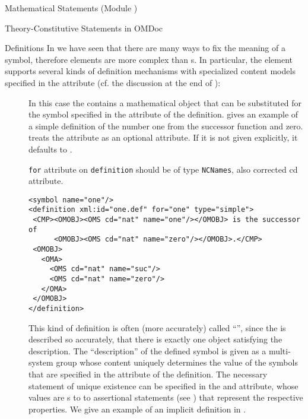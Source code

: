 \begin{tchapter}[id=statements,short=Mathematical Statements]{Mathematical Statements (Module {})}
\begin{tsection}[id=definitions]{Theory-Constitutive Statements in OMDoc}
\begin{tsubsection}[id=definitions]{Definitions}
  In {} we have seen that there are many ways to fix the meaning of a
  symbol, therefore {\omdoc} {} elements are more complex than
  {s}.  In particular, the {} element supports several
  kinds of definition mechanisms with specialized content models specified in the
  {} attribute (cf. the discussion at the end of
  {}):
\begin{description}
\item[{}] In this case the {}
  contains a mathematical object that can be substituted for the symbol specified
  in the {} attribute of the definition.
  {} gives an example of a simple definition of the number one from
  the successor function and zero. {\omdoc} treats the
  {} attribute as an optional attribute. If it is not
  given explicitly, it defaults to {}.
\begin{erratum}[reported-by=Michael Kohlhase,date=2009-08-11]{{\texttt{for}} attribute on
    {\texttt{definition}} should be of type {\texttt{NCNames}}, also corrected cd attribute.}
\begin{lstlisting}[label=lst:one,
  caption={A Simple {\omdoc} {\element{definition}}.},
  index={definition,CMP,FMP,OMOBJ}]
<symbol name="one"/>
<definition xml:id="one.def" for="one" type="simple">
 <CMP><OMOBJ><OMS cd="nat" name="one"/></OMOBJ> is the successor of 
      <OMOBJ><OMS cd="nat" name="zero"/></OMOBJ>.</CMP>
 <OMOBJ>
   <OMA>
     <OMS cd="nat" name="suc"/>
     <OMS cd="nat" name="zero"/>
   </OMA>
 </OMOBJ>
</definition>
\end{lstlisting}
\end{erratum}
\item[{}] This kind of definition is often (more
  accurately) called ``{\emph{}}'', since the
  {} is described so accurately, that there is exactly one object
  satisfying the description. The ``description'' of the defined symbol is given as a
  multi-system {} group whose content uniquely determines the value of the
  symbols that are specified in the {} attribute of the
  definition. The necessary statement of unique existence can be specified in the
  {} and {} attribute,
  whose values are {s} to to assertional
  statements (see ) that represent the
  respective properties.  We give an example of an implicit definition in
  {}.


\end{description}
\end{tsubsection}
\end{tsection}
\end{tchapter}
